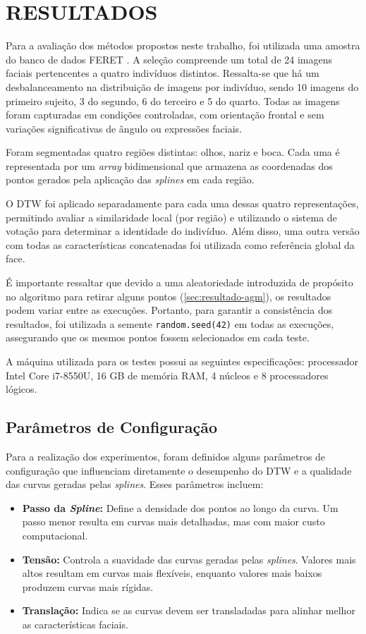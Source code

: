 \chapter{RESULTADOS} \label{cha:resultados}

Para a avaliação dos métodos propostos neste trabalho, foi utilizada uma amostra do banco de dados FERET \cite{FERET1,FERET2}. A seleção compreende um total de 24 imagens faciais pertencentes a quatro indivíduos distintos. Ressalta-se que há um desbalanceamento na distribuição de imagens por indivíduo, sendo 10 imagens do primeiro sujeito, 3 do segundo, 6 do terceiro e 5 do quarto. Todas as imagens foram capturadas em condições controladas, com orientação frontal e sem variações significativas de ângulo ou expressões faciais.

Foram segmentadas quatro regiões distintas: olhos, nariz e boca. Cada uma é representada por um \textit{array} bidimensional que armazena as coordenadas dos pontos gerados pela aplicação das \textit{splines} em cada região.


O DTW foi aplicado separadamente para cada uma dessas quatro representações, permitindo avaliar a similaridade local (por região) e utilizando o sistema de votação para determinar a identidade do indivíduo. Além disso, uma outra versão com todas as características concatenadas foi utilizada como referência global da face.

É importante ressaltar que devido a uma aleatoriedade introduzida de propósito no algoritmo para retirar alguns pontos (\autoref{sec:resultado-agm}), os resultados podem variar entre as execuções. Portanto, para garantir a consistência dos resultados, foi utilizada a semente \texttt{random.seed(42)} em todas as execuções, assegurando que os mesmos pontos fossem selecionados em cada teste.

A máquina utilizada para os testes possui as seguintes especificações: processador Intel Core i7-8550U, 16 GB de memória RAM, 4 núcleos e 8 processadores lógicos.

\section{Parâmetros de Configuração}
\label{sec:parametros-configuracao}

Para a realização dos experimentos, foram definidos alguns parâmetros de configuração que influenciam diretamente o desempenho do DTW e a qualidade das curvas geradas pelas \textit{splines}. Esses parâmetros incluem:
\begin{itemize}
    \item \textbf{Passo da \textit{Spline}:} Define a densidade dos pontos ao longo da curva. Um passo menor resulta em curvas mais detalhadas, mas com maior custo computacional.
    \item \textbf{Tensão:} Controla a suavidade das curvas geradas pelas \textit{splines}. Valores mais altos resultam em curvas mais flexíveis, enquanto valores mais baixos produzem curvas mais rígidas. %
    \item \textbf{Translação:} Indica se as curvas devem ser transladadas para alinhar melhor as características faciais.
\end{itemize}

